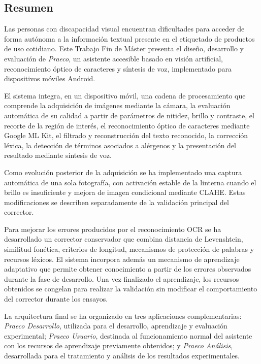 
\noindent \begin{center}
\section*{Resumen}
\par\end{center}

Las personas con discapacidad visual encuentran dificultades para acceder de forma autónoma a la información textual presente en el etiquetado de productos de uso cotidiano. Este Trabajo Fin de Máster presenta el diseño, desarrollo y evaluación de \textit{Praeco}, un asistente accesible basado en visión artificial, reconocimiento óptico de caracteres y síntesis de voz, implementado para dispositivos móviles Android.

El sistema integra, en un dispositivo móvil, una cadena de procesamiento que comprende la adquisición de imágenes mediante la cámara, la evaluación automática de su calidad a partir de parámetros de nitidez, brillo y contraste, el recorte de la región de interés, el reconocimiento óptico de caracteres mediante Google ML Kit, el filtrado y reconstrucción del texto reconocido, la corrección léxica, la detección de términos asociados a alérgenos y la presentación del resultado mediante síntesis de voz.

Como evolución posterior de la adquisición se ha implementado una captura automática de una sola fotografía, con activación estable de la linterna cuando el brillo es insuficiente y mejora de imagen condicional mediante CLAHE. Estas modificaciones se describen separadamente de la validación principal del corrector.

Para mejorar los errores producidos por el reconocimiento OCR se ha desarrollado un corrector conservador que combina distancia de Levenshtein, similitud fonética, criterios de longitud, mecanismos de protección de palabras y recursos léxicos. El sistema incorpora además un mecanismo de aprendizaje adaptativo que permite obtener conocimiento a partir de los errores observados durante la fase de desarrollo. Una vez finalizado el aprendizaje, los recursos obtenidos se congelan para realizar la validación sin modificar el comportamiento del corrector durante los ensayos.

La arquitectura final se ha organizado en tres aplicaciones complementarias: \textit{Praeco Desarrollo}, utilizada para el desarrollo, aprendizaje y evaluación experimental; \textit{Praeco Usuario}, destinada al funcionamiento normal del asistente con los recursos de aprendizaje previamente obtenidos; y \textit{Praeco Análisis}, desarrollada para el tratamiento y análisis de los resultados experimentales.

